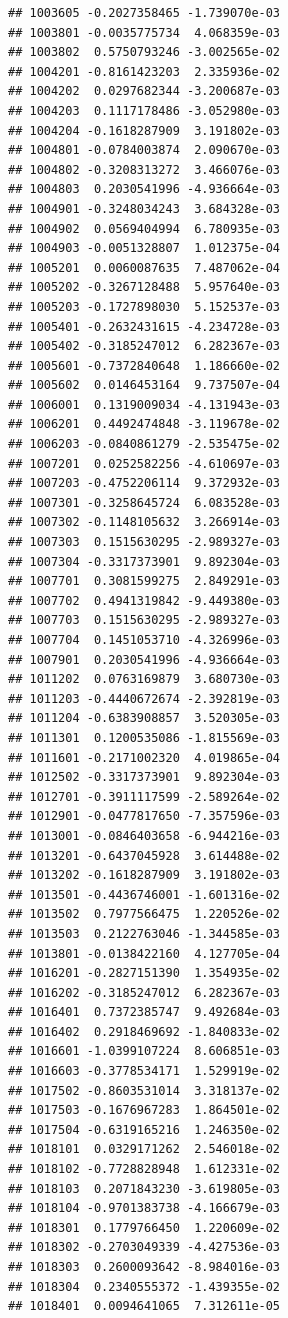 \documentclass[ignorenonframetext,]{beamer}
\begin{document}
\begin{frame}[fragile]
\begin{verbatim}
## 1003605 -0.2027358465 -1.739070e-03
## 1003801 -0.0035775734  4.068359e-03
## 1003802  0.5750793246 -3.002565e-02
## 1004201 -0.8161423203  2.335936e-02
## 1004202  0.0297682344 -3.200687e-03
## 1004203  0.1117178486 -3.052980e-03
## 1004204 -0.1618287909  3.191802e-03
## 1004801 -0.0784003874  2.090670e-03
## 1004802 -0.3208313272  3.466076e-03
## 1004803  0.2030541996 -4.936664e-03
## 1004901 -0.3248034243  3.684328e-03
## 1004902  0.0569404994  6.780935e-03
## 1004903 -0.0051328807  1.012375e-04
## 1005201  0.0060087635  7.487062e-04
## 1005202 -0.3267128488  5.957640e-03
## 1005203 -0.1727898030  5.152537e-03
## 1005401 -0.2632431615 -4.234728e-03
## 1005402 -0.3185247012  6.282367e-03
## 1005601 -0.7372840648  1.186660e-02
## 1005602  0.0146453164  9.737507e-04
## 1006001  0.1319009034 -4.131943e-03
## 1006201  0.4492474848 -3.119678e-02
## 1006203 -0.0840861279 -2.535475e-02
## 1007201  0.0252582256 -4.610697e-03
## 1007203 -0.4752206114  9.372932e-03
## 1007301 -0.3258645724  6.083528e-03
## 1007302 -0.1148105632  3.266914e-03
## 1007303  0.1515630295 -2.989327e-03
## 1007304 -0.3317373901  9.892304e-03
## 1007701  0.3081599275  2.849291e-03
## 1007702  0.4941319842 -9.449380e-03
## 1007703  0.1515630295 -2.989327e-03
## 1007704  0.1451053710 -4.326996e-03
## 1007901  0.2030541996 -4.936664e-03
## 1011202  0.0763169879  3.680730e-03
## 1011203 -0.4440672674 -2.392819e-03
## 1011204 -0.6383908857  3.520305e-03
## 1011301  0.1200535086 -1.815569e-03
## 1011601 -0.2171002320  4.019865e-04
## 1012502 -0.3317373901  9.892304e-03
## 1012701 -0.3911117599 -2.589264e-02
## 1012901 -0.0477817650 -7.357596e-03
## 1013001 -0.0846403658 -6.944216e-03
## 1013201 -0.6437045928  3.614488e-02
## 1013202 -0.1618287909  3.191802e-03
## 1013501 -0.4436746001 -1.601316e-02
## 1013502  0.7977566475  1.220526e-02
## 1013503  0.2122763046 -1.344585e-03
## 1013801 -0.0138422160  4.127705e-04
## 1016201 -0.2827151390  1.354935e-02
## 1016202 -0.3185247012  6.282367e-03
## 1016401  0.7372385747  9.492684e-03
## 1016402  0.2918469692 -1.840833e-02
## 1016601 -1.0399107224  8.606851e-03
## 1016603 -0.3778534171  1.529919e-02
## 1017502 -0.8603531014  3.318137e-02
## 1017503 -0.1676967283  1.864501e-02
## 1017504 -0.6319165216  1.246350e-02
## 1018101  0.0329171262  2.546018e-02
## 1018102 -0.7728828948  1.612331e-02
## 1018103  0.2071843230 -3.619805e-03
## 1018104 -0.9701383738 -4.166679e-03
## 1018301  0.1779766450  1.220609e-02
## 1018302 -0.2703049339 -4.427536e-03
## 1018303  0.2600093642 -8.984016e-03
## 1018304  0.2340555372 -1.439355e-02
## 1018401  0.0094641065  7.312611e-05

\end{verbatim}
\end{frame}
\end{document}
